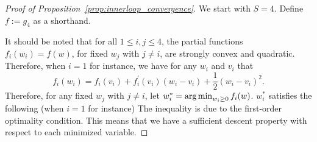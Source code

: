 \begin{proof}[Proof of Proposition~\ref{prop:innerloop_convergence}]
We start with $S=4$. Define $f:=g_4$ as a shorthand. 

It should be noted that for all $1 \leq i , j \leq 4$, the partial functions $f_{i}\left(w_{i}\right) = f\left(w\right)$, for fixed $w_{j}$ with $j \neq i$, are strongly convex and quadratic. Therefore, when $i = 1$ for instance, we have for any $w_{i}$ and $v_{i}$ that
    \begin{equation*}
        f_{i}\left(w_{i}\right) = f_{i}\left(v_{i}\right) +    f_{i}^\prime\left(v_{i}\right) \left(w_{i} - v_{i}\right) + \frac{1}{2}(w_{i} - v_{i})^{2}.
    \end{equation*}
    Therefore, for any fixed $w_{j}$ with $j \neq i$, let $w_{i}^{\ast} = \operatorname*{arg\,min}_{w_i\geq 0} f_i(w)$.
    $w_{i}^{\ast}$ satisfies the following (when $i = 1$ for instance)
The inequality is due to the first-order optimality condition.
    This means that we have a sufficient descent property with respect to each minimized variable.


\end{proof}
